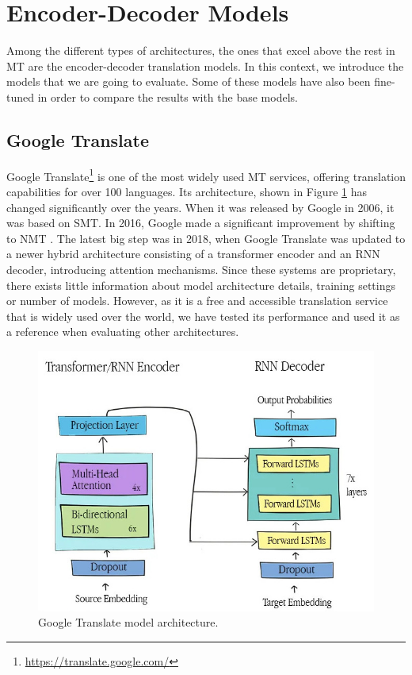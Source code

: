 \documentclass[11pt,english,listoffigures,listoftables]{tfgetsinf}
\begin{document}
\section{Encoder-Decoder Models}

Among the different types of architectures, the ones that excel above the rest in MT are the encoder-decoder translation models. In this context, we introduce the models that we are going to evaluate. Some of these models have also been fine-tuned in order to compare the results with the base models.

\subsection{Google Translate}

Google Translate\footnote{\url{https://translate.google.com/}} is one of the most widely used MT services, offering translation capabilities for over 100 languages. Its architecture, shown in Figure \ref{fig:google_translate} has changed significantly over the years. When it was released by Google in 2006, it was based on SMT. In 2016, Google made a significant improvement by shifting to NMT \cite{wu2016google}. The latest big step was in 2018, when Google Translate was updated to a newer hybrid architecture consisting of a transformer encoder and an RNN decoder, introducing attention mechanisms. Since these systems are proprietary, there exists little information about model architecture details, training settings or number of models. However, as it is a free and accessible translation service that is widely used over the world, we have tested its performance and used it as a reference when evaluating other architectures. 

\begin{figure}
    \centering
    \includegraphics[width=0.7\linewidth]{google_translate.jpg}
    \caption{Google Translate model architecture.\protect\footnotemark}
    \label{fig:google_translate}
\end{figure}
\end{document}
